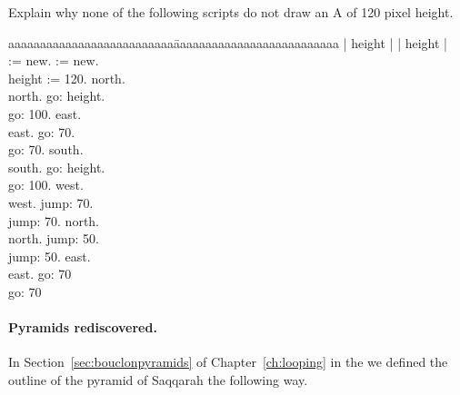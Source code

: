 
\begin{exonofig}
Explain why none of the following scripts do not draw an A of 120
pixel height.
\begin{nalltt}
\begin{tabbing}
aaaaaaaaaaaaaaaaaaaaaaaaaa\=aaaaaaaaaaaaaaaaaaaaaaaaaa\kill
| \caro height |               \>| \caro height |       \\             
\caro := \Turtle new.         \>\caro := \Turtle new.\\
height := 120.                   \>\caro north.\\
\caro north.                      \>\caro go: height.\\
\caro go: 100.                      \>\caro east.\\
\caro east.                               \>\caro go: 70.\\
\caro go: 70.                               \>\caro south.\\
\caro south.                              \>\caro go: height.\\
\caro go: 100.                             \>\caro west.\\
\caro west.                                 \>\caro jump: 70.\\
\caro jump: 70.                            \>\caro north.\\
\caro north.                                  \>\caro jump: 50.\\
\caro jump: 50.                              \>\caro east.\\
\caro east.                                       \>\caro go: 70\\
\caro go: 70
\end{tabbing}
\end{nalltt}
\end{exonofig}

\paragraph{Pyramids rediscovered.} In Section~\ref{sec:bouclonpyramids} of Chapter~\ref{ch:looping} in the  
we defined the outline of the pyramid of Saqqarah the following way.


